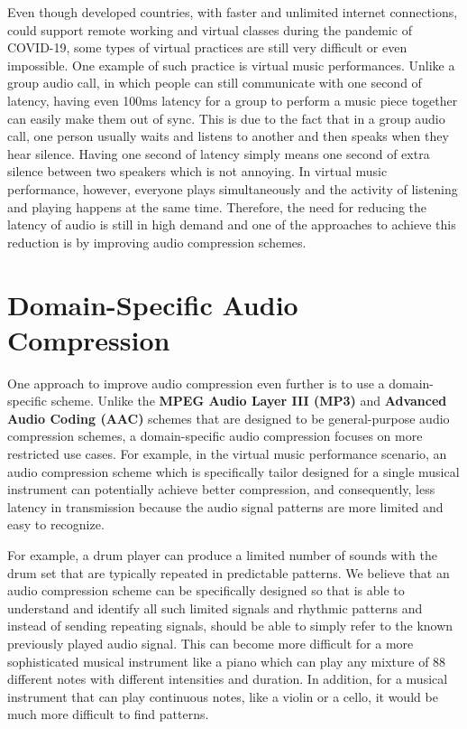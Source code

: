 Even though developed countries, with faster and unlimited internet connections, could support remote working and virtual classes during the pandemic of COVID-19, some types of virtual practices are still very difficult or even impossible\cite{bartlette2006effect,chafe2010effect}. One example of such practice is virtual music performances. Unlike a group audio call, in which people can still communicate with one second of latency, having even 100ms latency for a group to perform a music piece together can easily make them out of sync\cite{chafe2004effect,bartlette2006effect}. This is due to the fact that in a group audio call, one person usually waits and listens to another and then speaks when they hear silence. Having one second of latency simply means one second of extra silence between two speakers which is not annoying. In virtual music performance, however, everyone plays simultaneously and the activity of listening and playing happens at the same time. Therefore, the need for reducing the latency of audio is still in high demand and one of the approaches to achieve this reduction is by improving audio compression schemes.



\section{Domain-Specific Audio Compression} 

One approach to improve audio compression even further is to use a domain-specific scheme. Unlike the \textbf{MPEG Audio Layer III (MP3)} and \textbf{Advanced Audio Coding (AAC)} schemes that are designed to be general-purpose audio compression schemes, a domain-specific audio compression focuses on more restricted use cases. For example, in the virtual music performance scenario, an audio compression scheme which is specifically tailor designed for a single musical instrument can potentially achieve better compression, and consequently, less latency in transmission because the audio signal patterns are more limited and easy to recognize. 

For example, a drum player can produce a limited number of sounds with the drum set that are typically repeated in  predictable patterns. We believe that an audio compression scheme can be specifically designed so that is able to understand and identify all such limited signals and rhythmic patterns and instead of sending repeating signals, should be able to simply refer to the known previously played audio signal. This can become more difficult for a more sophisticated musical instrument like a piano which can play any mixture of 88 different notes with different intensities and duration. In addition, for a musical instrument that can play continuous notes, like a violin or a cello, it would be much more difficult to find patterns.

